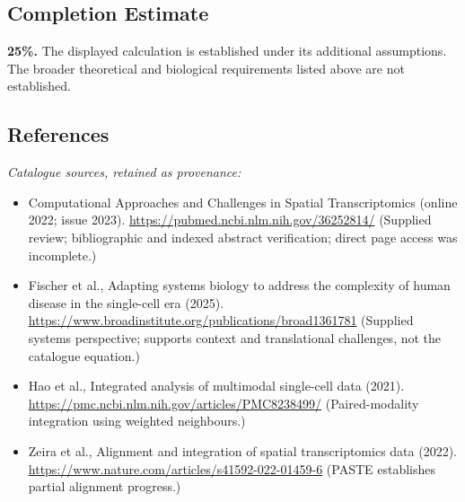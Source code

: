 \documentclass[11pt]{article}
\begin{document}
\subsection{Completion Estimate}
\textbf{25\%.} The displayed calculation is established under its additional assumptions. The broader theoretical and biological requirements listed above are not established.
\subsection{References}
\noindent\emph{Catalogue sources, retained as provenance:}
\begin{itemize}
\item Computational Approaches and Challenges in Spatial Transcriptomics (online 2022; issue 2023). \url{https://pubmed.ncbi.nlm.nih.gov/36252814/} (Supplied review; bibliographic and indexed abstract verification; direct page access was incomplete.)
\item Fischer et al., Adapting systems biology to address the complexity of human disease in the single-cell era (2025). \url{https://www.broadinstitute.org/publications/broad1361781} (Supplied systems perspective; supports context and translational challenges, not the catalogue equation.)
\item Hao et al., Integrated analysis of multimodal single-cell data (2021). \url{https://pmc.ncbi.nlm.nih.gov/articles/PMC8238499/} (Paired-modality integration using weighted neighbours.)
\item Zeira et al., Alignment and integration of spatial transcriptomics data (2022). \url{https://www.nature.com/articles/s41592-022-01459-6} (PASTE establishes partial alignment progress.)
\end{itemize}
\end{document}
